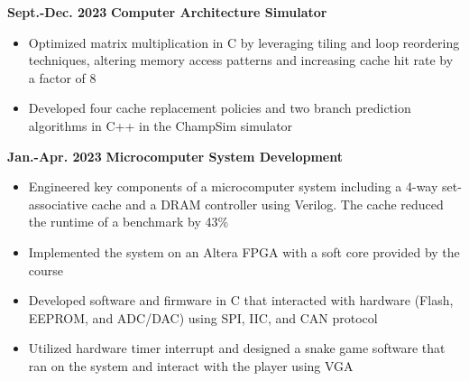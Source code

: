 \documentclass[11pt,a4paper,sans]{moderncv}
\begin{document}

\cventry
{\textnormal{\textbf{Sept.-Dec. 2023}}}
{\textnormal{\textbf{Computer Architecture Simulator}}}
{}{}{}
{
    \begin{itemize}
        \item Optimized matrix multiplication in C by leveraging tiling and loop reordering techniques, altering memory access patterns and increasing cache hit rate by a factor of 8
        \item Developed four cache replacement policies and two branch prediction algorithms in C++ in the ChampSim simulator
    \end{itemize}
}

\cventry
{\textnormal{\textbf{Jan.-Apr. 2023}}}
{\textnormal{\textbf{Microcomputer System Development}}}
{}{}{}
{
    \begin{itemize}
    \item Engineered key components of a microcomputer system including a 4-way set-associative cache and a DRAM controller using Verilog. The cache reduced the runtime of a benchmark by 43\%
    \item Implemented the system on an Altera FPGA with a soft core provided by the course 
    \item Developed software and firmware in C that interacted with hardware (Flash, EEPROM, and ADC/DAC) using SPI, IIC, and CAN protocol 
    \item Utilized hardware timer interrupt and designed a snake game software that ran on the system and interact with the player using VGA
    \end{itemize}
}
\end{document}

